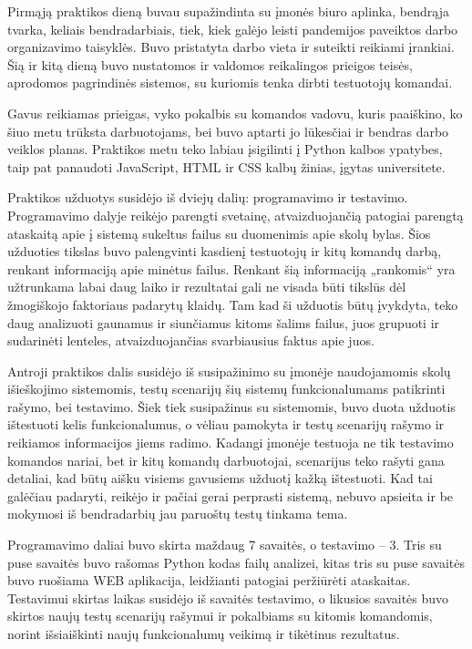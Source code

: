 \documentclass{VUMIFPSkursinis}
\begin{document}
Pirmąją praktikos dieną buvau supažindinta su įmonės biuro aplinka, bendrąja tvarka, keliais bendradarbiais, tiek, kiek galėjo leisti pandemijos paveiktos darbo organizavimo taisyklės. Buvo pristatyta darbo vieta ir suteikti reikiami įrankiai. Šią ir kitą dieną buvo nustatomos ir valdomos reikalingos prieigos teisės, aprodomos pagrindinės sistemos, su kuriomis tenka dirbti testuotojų komandai.

Gavus reikiamas prieigas, vyko pokalbis su komandos vadovu, kuris paaiškino, ko šiuo metu trūksta darbuotojams, bei buvo aptarti jo lūkesčiai ir bendras darbo veiklos planas. Praktikos metu teko labiau įsigilinti į Python kalbos ypatybes, taip pat panaudoti JavaScript, HTML ir CSS kalbų žinias, įgytas universitete. 

Praktikos užduotys susidėjo iš dviejų dalių: programavimo ir testavimo. Programavimo dalyje reikėjo parengti svetainę, atvaizduojančią patogiai parengtą ataskaitą apie į sistemą sukeltus failus su duomenimis apie skolų bylas. Šios užduoties tikslas buvo palengvinti kasdienį testuotojų ir kitų komandų darbą, renkant informaciją apie minėtus failus. Renkant šią informaciją „rankomis“ yra užtrunkama labai daug laiko ir rezultatai gali ne visada būti tikslūs dėl žmogiškojo faktoriaus padarytų klaidų. Tam kad ši užduotis būtų įvykdyta, teko daug analizuoti gaunamus ir siunčiamus kitoms šalims failus, juos grupuoti ir sudarinėti lenteles, atvaizduojančias svarbiausius faktus apie juos.

Antroji praktikos dalis susidėjo iš susipažinimo su įmonėje naudojamomis skolų išieškojimo sistemomis, testų scenarijų šių sistemų funkcionalumams patikrinti rašymo, bei testavimo. Šiek tiek susipažinus su sistemomis, buvo duota užduotis ištestuoti kelis funkcionalumus, o vėliau pamokyta ir testų scenarijų rašymo ir reikiamos informacijos jiems radimo. Kadangi įmonėje testuoja ne tik testavimo komandos nariai, bet ir kitų komandų darbuotojai, scenarijus teko rašyti gana detaliai, kad būtų aišku visiems gavusiems užduotį kažką ištestuoti. Kad tai galėčiau padaryti, reikėjo ir pačiai gerai perprasti sistemą, nebuvo apsieita ir be mokymosi iš bendradarbių jau paruoštų testų tinkama tema.

Programavimo daliai buvo skirta maždaug 7 savaitės, o testavimo -- 3. Tris su puse savaitės buvo rašomas Python kodas failų analizei,  kitas tris su puse savaitės buvo ruošiama WEB aplikacija, leidžianti patogiai peržiūrėti ataskaitas. Testavimui skirtas laikas susidėjo iš savaitės testavimo, o likusios savaitės buvo skirtos naujų testų scenarijų rašymui ir pokalbiams su kitomis komandomis, norint išsiaiškinti naujų funkcionalumų veikimą ir tikėtinus rezultatus.
\end{document}

